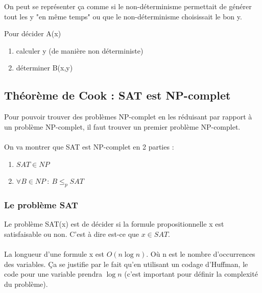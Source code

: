 \begin{myrem}
	On peut se représenter ça comme si le non-déterminisme permettait
       	de générer tout les y "en même temps" ou 
	que le non-déterminisme choisissait le bon y.
\end{myrem}

\begin{mydef}
	Pour décider A(x)
	\begin{enumerate}
		\item calculer y (de manière non déterministe)
		\item déterminer B(x,y)
	\end{enumerate}
\end{mydef}

\subsection{Théorème de Cook : SAT est NP-complet}
Pour pouvoir trouver des problèmes NP-complet en les réduisant par rapport à
un problème NP-complet, il faut trouver un premier problème NP-complet. 
\paragraph{} On va montrer que SAT est NP-complet en 2 parties :
\begin{enumerate}
	\item $SAT \in NP$
	\item $\forall B \in NP \ : \  B\leq_p SAT $
\end{enumerate}

\subsubsection{Le problème SAT}
Le problème SAT(x) est de décider si la formule propositionnelle x est 
satisfaisable ou non. C'est à dire est-ce que $x\in SAT$.

\paragraph{} La longueur d'une formule x est $O(n\log n)$. Où n est le nombre
d'occurrences des variables. Ça se justifie par le fait qu'en utilisant un codage
d'Huffman, le code pour une variable prendra $\log n$ (c'est important pour
définir la complexité du problème).

